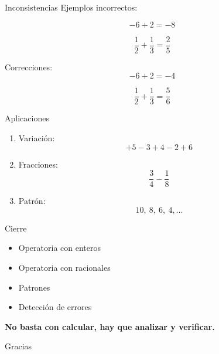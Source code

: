\documentclass{beamer}
\begin{document}
	\begin{frame}{Inconsistencias}
		Ejemplos incorrectos:
		
		\[
		-6+2=-8
		\]
		
		\pause
		
		\[
		\frac{1}{2}+\frac{1}{3}=\frac{2}{5}
		\]
		
		\pause
		
		Correcciones:
		\[
		-6+2=-4
		\]
		
		\[
		\frac{1}{2}+\frac{1}{3}=\frac{5}{6}
		\]
	\end{frame}
	
	\begin{frame}{Aplicaciones}
		\begin{enumerate}
			\item Variación:
			\[
			+5-3+4-2+6
			\]
			
			\item Fracciones:
			\[
			\frac{3}{4}-\frac{1}{8}
			\]
			
			\item Patrón:
			\[
			10,\ 8,\ 6,\ 4,\dots
			\]
		\end{enumerate}
	\end{frame}
	
	\begin{frame}{Cierre}
		\begin{itemize}
			\item Operatoria con enteros
			\item Operatoria con racionales
			\item Patrones
			\item Detección de errores
		\end{itemize}
		
		\vspace{0.3cm}
		
		\centering
		\textbf{No basta con calcular, hay que analizar y verificar.}
	\end{frame}
	
	\begin{frame}
		\centering
		\Huge Gracias
	\end{frame}
	
\end{document}
